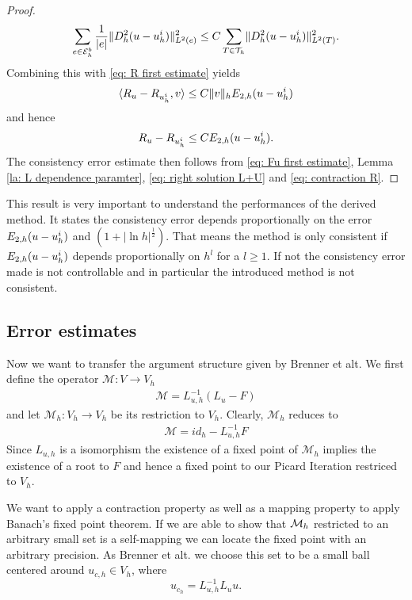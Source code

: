 \begin{proof}
	\begin{align}
	\sum_{e \in \mathcal{E}_h^b} \frac 1 {|e|} \lVert  D_h^2 (u-u_h^i) \rVert_{L^2(e)}^2 
	\leq C \sum_{T \in \mathcal{T}_h} \lVert D_h^2 (u-u_h^i) \rVert_{L^2(T)}^2.
	\end{align}
	Combining this with \eqref{eq: R first estimate} yields
	\begin{align*}
	 \langle R_u - R_{u^i_h}, v \rangle \leq C \lVert v \rVert_{h} E_{2,h}(u-u_h^i)
	\end{align*}
	and hence 
	\begin{align}
	{R_u - R_{u^i_h}} \leq C E_{2,h}(u-u_h^i). \label{eq: contraction R}
	\end{align}
	The consistency error estimate then follows from \eqref{eq: Fu first estimate}, Lemma \ref{la: L dependence paramter}, \eqref{eq: right solution L+U} and \eqref{eq: contraction R}.
\end{proof}

This result is very important to understand the performances of the derived method. It states the consistency error depends proportionally on the error $E_{2,h}(u-u^i_h)$ and $(1+|\ln h|^{\frac 1 2})$. That means the method is only consistent if $E_{2,h}(u-u^i_h)$ depends proportionally on $h^l$ for a $l \geq 1$. If not the consistency error made is not controllable and in particular the introduced method is not consistent.

\subsection{Error estimates}
Now we want to transfer the argument structure given by Brenner et alt. We first define the operator $\mathcal M: V \rightarrow V_h$
\begin{align}
	\mathcal M = L_{u,h}^{-1}(L_{u} - F)
\end{align}
and let $\mathcal M_h:V_h \rightarrow V_h$ be its restriction to $V_h$. Clearly, $\mathcal M_h$ reduces to 
\begin{align}
\mathcal M = id_h - L_{u,h}^{-1}F
\end{align}
Since $L_{u,h}$ is a isomorphism the existence of a fixed point of $\mathcal M_h$ implies the existence of a root to $F$ and hence a fixed point to our Picard Iteration restriced to $V_h$.

We want to apply a contraction property as well as a mapping property to apply Banach's fixed point theorem. If we are able to show that $\mathcal M_h$ restricted to an arbitrary small set is a self-mapping we can locate the fixed point with an arbitrary precision. As Brenner et alt. we choose this set to be a small ball centered around $u_{c,h}\in V_h$, where
\[
u_{c_h} = L_{u,h}^{-1} L_u u.
\]

